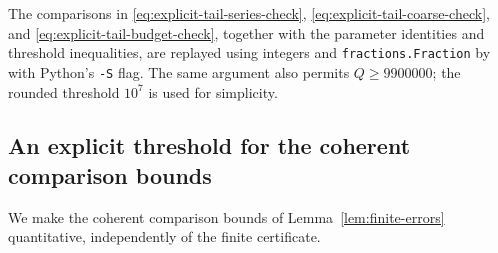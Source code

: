 \documentclass[11pt]{article}
\begin{document}
The comparisons in
\eqref{eq:explicit-tail-series-check},
\eqref{eq:explicit-tail-coarse-check}, and
\eqref{eq:explicit-tail-budget-check}, together with the parameter identities
and threshold inequalities, are replayed using integers and
\texttt{fractions.Fraction} by
 with Python's \texttt{-S} flag.
The same argument also permits $Q\ge9900000$; the rounded threshold $10^7$
is used for simplicity.

\subsection{An explicit threshold for the coherent comparison bounds}
\label{app:explicit-coherent-threshold}

We make the coherent comparison bounds of Lemma~\ref{lem:finite-errors}
quantitative, independently of the finite certificate.
\end{document}
